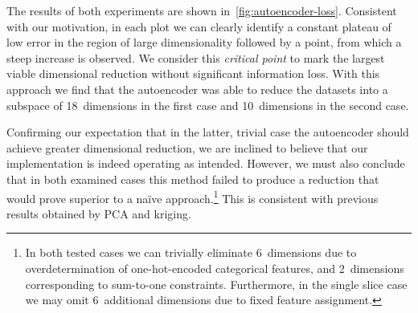 The results of both experiments are shown in~\cref{fig:autoencoder-loss}.
Consistent with our motivation, in each plot we can clearly identify a constant
plateau of low error in the region of large dimensionality followed by a point,
from which a steep increase is observed.
We consider this \textit{critical point} to mark the largest viable
dimensional reduction without significant information loss.
With this approach we find that the autoencoder was able to reduce the
datasets into a subspace of 18~dimensions in the first case and 10~dimensions in
the second case.

Confirming our expectation that in the latter, trivial case the
autoencoder should achieve greater dimensional reduction, we are inclined to
believe that our implementation is indeed operating as intended. However, we
must also conclude that in both examined cases this method failed to produce a
reduction that would prove superior to a naïve approach.\footnote{In both tested cases we
	can trivially eliminate 6~dimensions due to overdetermination of one-hot-encoded
	categorical features, and 2~dimensions corresponding to sum-to-one constraints. Furthermore, in the
	single slice case we may omit 6~additional dimensions due to fixed feature
	assignment.} This is consistent with previous results obtained by PCA and kriging.



